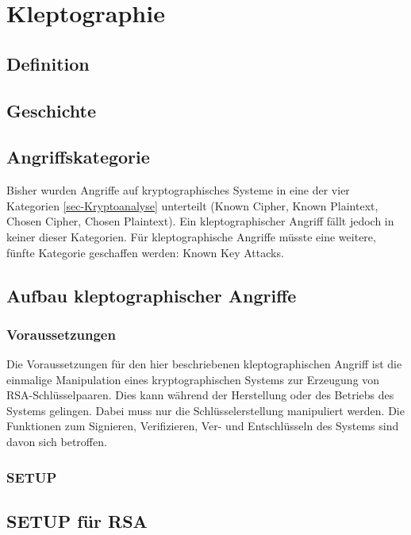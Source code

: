 \chapter{Kleptographie}
    \section{Definition}


    \section{Geschichte}

    \section{Angriffskategorie}
        Bisher wurden Angriffe auf kryptographisches Systeme in eine der vier Kategorien \ref{sec-Kryptoanalyse} unterteilt (Known Cipher, Known Plaintext, Chosen Cipher, Chosen Plaintext). Ein kleptographischer Angriff fällt jedoch in keiner dieser Kategorien. Für kleptographische Angriffe müsste eine weitere, fünfte Kategorie geschaffen werden: Known Key Attacks. 

    \section{Aufbau kleptographischer Angriffe}
    

        \subsection{Voraussetzungen} 
        Die Voraussetzungen für den hier beschriebenen kleptographischen Angriff ist die einmalige Manipulation eines kryptographischen Systems zur Erzeugung von \ac{RSA}-Schlüsselpaaren. Dies kann während der Herstellung oder des Betriebs des Systems gelingen. Dabei muss nur die Schlüsselerstellung manipuliert werden. Die Funktionen zum Signieren, Verifizieren, Ver- und Entschlüsseln des Systems sind davon sich betroffen.


        \subsection{SETUP}

    \section{SETUP für RSA}
